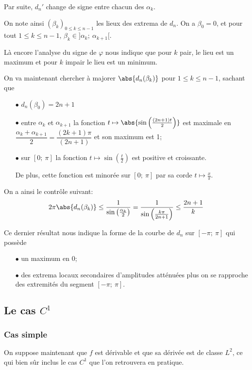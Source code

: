Par suite, $d_n'$ change de signe entre chacun des $\alpha_k$. 

On note ainsi $(\beta_k)_{0 \leq k \leq n-1}$ les lieux des extrema de $d_n$. On a $\beta_0 = 0$, et pour tout $1 \leq k \leq n-1$, $\beta_k \in ]\alpha_k;~\alpha_{k+1}[$. 

Là encore l'analyse du signe de $\varphi$ nous indique que pour $k$ pair, le lieu est un maximum et pour $k$ impair le lieu est un minimum.

On va maintenant chercher à majorer $\abs{d_n(\beta_k)}$ pour $1 \leq k \leq n-1$, sachant que 
\begin{itemize}
\item[$\bullet$]
$d_n(\beta_0) = 2n+1$
\item[$\bullet$]
entre $\alpha_k$ et $\alpha_{k+1}$ la fonction $t \mapsto \abs{\sin \left ( \frac{(2n+1)t}{2}\right )}$ est maximale en $\dfrac{\alpha_k+\alpha_{k+1}}{2} = \dfrac{(2k+1)\pi}{(2n+1)}$ et son maximum est 1;
\item[$\bullet$]
sur $[0;~\pi]$ la fonction $t \mapsto \sin \left ( \frac{t}{2}\right )$ est positive et croissante. 

De plus, cette fonction est minorée sur $[0;~\pi]$ par sa corde $t \mapsto \frac{x}{\pi}$.
\end{itemize}

On a ainsi le contrôle suivant:
\[
2\pi \abs{d_n(\beta_k)} \leq \dfrac{1}{\sin \left (\frac{\alpha_k}{2}\right )} = \dfrac{1}{\sin \left (\frac{k \pi}{2n+1}\right )} \leq \dfrac{2n+1}{k}
\]

Ce dernier résultat nous indique la forme de la courbe de $d_n$ sur $[-\pi;~\pi]$ qui possède
\begin{itemize}
\item[$\bullet$]
un maximum en $0$;
\item[$\bullet$]
des extrema locaux secondaires d'amplitudes atténuées plus on se rapproche des extremités du segment $[-\pi;~\pi]$.
\end{itemize}

\subsection{Le cas $C^1$}

\subsubsection{Cas simple}

On suppose maintenant que $f$ est dérivable et que sa dérivée est de classe $L^2$, ce qui bien sûr inclus le cas $C^1$ que l'on retrouvera en pratique.


